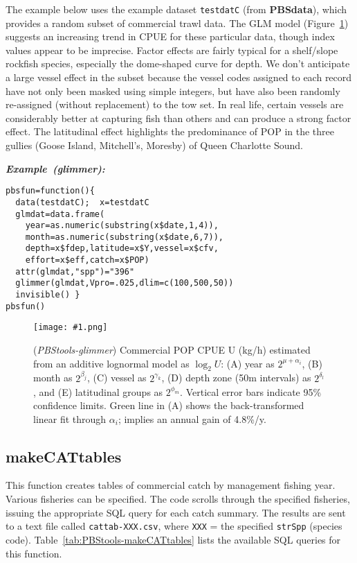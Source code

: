 \documentclass[letterpaper,12pt,fleqn]{article}
\def\tab{\hspace{0.5 in}}
\newcommand{\code}[1]{\small\texttt{#1}\normalsize}
\newcommand{\pkg}[1]{{\bf #1}}
\newcommand\pbsfig[4]{    %
	\begin{figure}[ht!] %
	\centering
	\texttt{[image: \#1.png]}
	\ifthenelse{\isempty{#4}}
		{\caption[#2]{(\emph{#1}) #2}\vspace{-2ex}}
		{\caption[#4]{(\emph{#1}) #2}\vspace{-2ex}}
	\label{fig:#1}
	\end{figure}
}
\newcommand\example[1]{    %
	\textbf{\emph{Example~(#1):}}\\ \vspace{3 pt}
}
\begin{document}
\tab The example below uses the example dataset \code{testdatC} (from \pkg{PBSdata}), which provides a random subset of commercial trawl data. The GLM model (Figure~\ref{fig:PBStools-glimmer}) suggests an increasing trend in CPUE for these particular data, though index values appear to be imprecise. Factor effects are fairly typical for a shelf/slope rockfish species, especially the dome-shaped curve for depth. We don't anticipate a large vessel effect in the subset because the vessel codes assigned to each record have not only been masked using simple integers, but have also been randomly re-assigned (without replacement) to the tow set. In real life, certain vessels are considerably better at capturing fish than others and can produce a strong factor effect. The latitudinal effect highlights the predominance of POP in the three gullies (Goose Island, Mitchell's, Moresby) of Queen Charlotte Sound.

\begin{examplebox}
\example{glimmer}
\begin{Verbatim}[fontsize=\footnotesize]
pbsfun=function(){
  data(testdatC);  x=testdatC
  glmdat=data.frame(
    year=as.numeric(substring(x$date,1,4)),
    month=as.numeric(substring(x$date,6,7)),
    depth=x$fdep,latitude=x$Y,vessel=x$cfv,
    effort=x$eff,catch=x$POP)
  attr(glmdat,"spp")="396"
  glimmer(glmdat,Vpro=.025,dlim=c(100,500,50))
  invisible() }
pbsfun()
\end{Verbatim}
\end{examplebox}
\pbsfig{PBStools-glimmer}{Commercial POP CPUE U (kg/h) estimated from an additive lognormal model as $\log_2 U$: (A) year as $2^{\mu + \alpha_i}$, (B) month as $2^{\beta_j}$, (C) vessel as $2^{\gamma_k}$, (D) depth zone (50m intervals) as $2^{\delta_l}$, and (E) latitudinal groups as $2^{\phi_m}$. Vertical error bars indicate 95\% confidence limits. Green line in (A) shows the back-transformed linear fit through $\alpha_i$; implies an annual gain of 4.8\%/y.}{3.0}{GLM analysis of POP catch per unit effort}

\subsection {makeCATtables}

\tab This function creates tables of commercial catch by management fishing year. Various fisheries can be specified. The code scrolls through the specified fisheries, issuing the appropriate SQL query for each catch summary. The results are sent to a text file called \code{cattab-XXX.csv}, where \code{XXX} = the specified \code{strSpp} (species code). Table~\ref{tab:PBStools-makeCATtables} lists the available SQL queries for this function.
\end{document}
